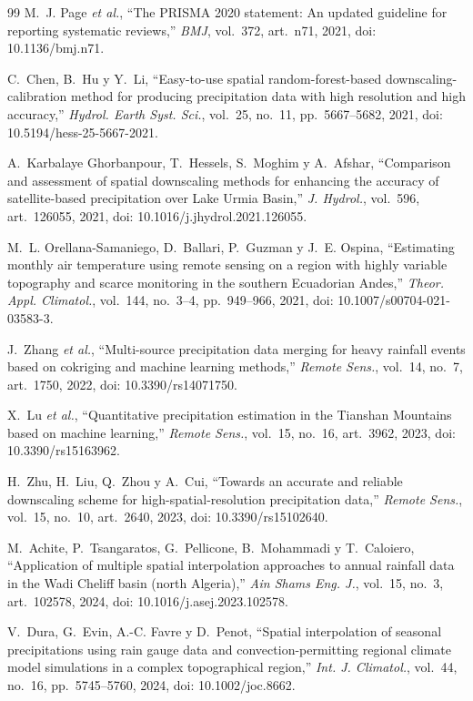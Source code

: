 \documentclass[conference]{IEEEtran}
\begin{document}
\begin{thebibliography}{99}
M.~J. Page \textit{et al.}, ``The PRISMA 2020 statement: An updated guideline for reporting systematic reviews,'' \textit{BMJ}, vol.~372, art.~n71, 2021, doi: 10.1136/bmj.n71.

C.~Chen, B.~Hu y Y.~Li, ``Easy-to-use spatial random-forest-based downscaling-calibration method for producing precipitation data with high resolution and high accuracy,'' \textit{Hydrol. Earth Syst. Sci.}, vol.~25, no.~11, pp.~5667--5682, 2021, doi: 10.5194/hess-25-5667-2021.

A.~Karbalaye Ghorbanpour, T.~Hessels, S.~Moghim y A.~Afshar, ``Comparison and assessment of spatial downscaling methods for enhancing the accuracy of satellite-based precipitation over Lake Urmia Basin,'' \textit{J. Hydrol.}, vol.~596, art.~126055, 2021, doi: 10.1016/j.jhydrol.2021.126055.

M.~L. Orellana-Samaniego, D.~Ballari, P.~Guzman y J.~E. Ospina, ``Estimating monthly air temperature using remote sensing on a region with highly variable topography and scarce monitoring in the southern Ecuadorian Andes,'' \textit{Theor. Appl. Climatol.}, vol.~144, no.~3--4, pp.~949--966, 2021, doi: 10.1007/s00704-021-03583-3.

J.~Zhang \textit{et al.}, ``Multi-source precipitation data merging for heavy rainfall events based on cokriging and machine learning methods,'' \textit{Remote Sens.}, vol.~14, no.~7, art.~1750, 2022, doi: 10.3390/rs14071750.

X.~Lu \textit{et al.}, ``Quantitative precipitation estimation in the Tianshan Mountains based on machine learning,'' \textit{Remote Sens.}, vol.~15, no.~16, art.~3962, 2023, doi: 10.3390/rs15163962.

H.~Zhu, H.~Liu, Q.~Zhou y A.~Cui, ``Towards an accurate and reliable downscaling scheme for high-spatial-resolution precipitation data,'' \textit{Remote Sens.}, vol.~15, no.~10, art.~2640, 2023, doi: 10.3390/rs15102640.

M.~Achite, P.~Tsangaratos, G.~Pellicone, B.~Mohammadi y T.~Caloiero, ``Application of multiple spatial interpolation approaches to annual rainfall data in the Wadi Cheliff basin (north Algeria),'' \textit{Ain Shams Eng. J.}, vol.~15, no.~3, art.~102578, 2024, doi: 10.1016/j.asej.2023.102578.

V.~Dura, G.~Evin, A.-C. Favre y D.~Penot, ``Spatial interpolation of seasonal precipitations using rain gauge data and convection-permitting regional climate model simulations in a complex topographical region,'' \textit{Int. J. Climatol.}, vol.~44, no.~16, pp.~5745--5760, 2024, doi: 10.1002/joc.8662.


\end{thebibliography}
\end{document}
